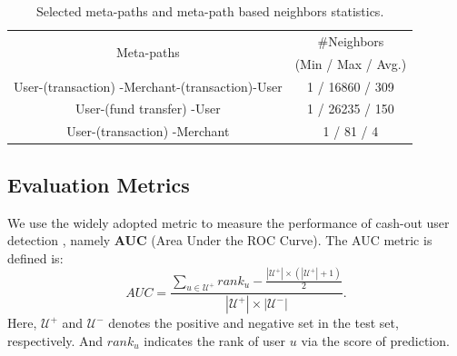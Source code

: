 \begin{table}[t]
\footnotesize
\centering
\caption{Selected meta-paths and meta-path based neighbors statistics. } \label{tab-mp}
\begin{tabular}{c|c}%
\hline
\multirow{2}{*}{Meta-paths} & {\#Neighbors }\\%
\multirow{2}{*}{} & {(Min / Max / Avg.)} \\
\hline
{User-\scriptsize (transaction) -\small Merchant-\scriptsize (transaction)\small -User} & {1 / 16860 / 309}\\
\hline
{User-\scriptsize (fund transfer) \small-User}& {1 / 26235 / 150}\\
\hline
{User-\scriptsize (transaction) \small-Merchant} & {1 / 81 / 4} \\
\hline
\end{tabular}
\end{table}

\subsection{Evaluation Metrics}
We use the widely adopted metric to measure the performance of cash-out user detection , namely \textbf{AUC} (\ie Area Under the ROC Curve). The AUC metric is defined is:
\begin{equation}
AUC = \frac{\sum_{u \in \mathcal{U}^+}{rank_{u}} - \frac{|\mathcal{U}^+| \times (|\mathcal{U}^+| + 1)}{2}}{|\mathcal{U}^+| \times |\mathcal{U}^-| }.
\end{equation}
Here, $\mathcal{U}^+$ and $\mathcal{U}^-$ denotes the positive and negative set in the test set, respectively. And $rank_u$ indicates the rank of user $u$ via the score of prediction.



